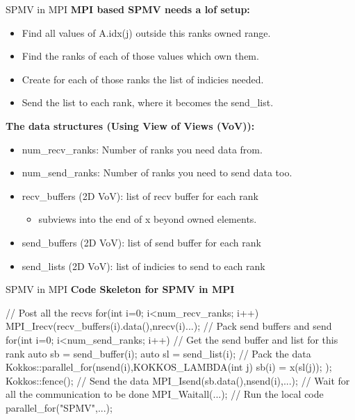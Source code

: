 \begin{frame}[fragile]{SPMV in MPI}
    \textbf{MPI based SPMV needs a lof setup:}
  \begin{itemize}
    \item Find all values of A.idx(j) outside this ranks owned range.
    \item Find the ranks of each of those values which own them.
    \item Create for each of those ranks the list of indicies needed.
    \item Send the list to each rank, where it becomes the send\_list.
  \end{itemize}
  \vspace{5pt}
  \textbf{The data structures (Using View of Views (VoV)):}
  \begin{itemize}
    \item num\_recv\_ranks: Number of ranks you need data from.
    \item num\_send\_ranks: Number of ranks you need to send data too.
    \item recv\_buffers (2D VoV): list of recv buffer for each rank
    \begin{itemize}
      \item subviews into the end of x beyond owned elements.
    \end{itemize}
    \item send\_buffers (2D VoV): list of send buffer for each rank
    \item send\_lists (2D VoV): list of indicies to send to each rank
  \end{itemize}
\end{frame}


\begin{frame}[fragile]{SPMV in MPI}
\textbf{Code Skeleton for SPMV in MPI}
  \begin{code}[keywords={MPI_Irecv,MPI_Isend,MPI_Waitall,parallel_for,fence, Kokkos}]
    // Post all the recvs
    for(int i=0; i<num_recv_ranks; i++) {
      MPI_Irecv(recv_buffers(i).data(),nrecv(i)...);
    }
    // Pack send buffers and send
    for(int i=0; i<num_send_ranks; i++) {
      // Get the send buffer and list for this rank
      auto sb = send_buffer(i);
      auto sl = send_list(i);
      // Pack the data
      Kokkos::parallel_for(nsend(i),KOKKOS_LAMBDA(int j) 
        { sb(i) = x(sl(j)); });
      Kokkos::fence();
      // Send the data
      MPI_Isend(sb.data(),nsend(i),...);
    }
    // Wait for all the communication to be done
    MPI_Waitall(...);
    // Run the local code
    parallel_for("SPMV",...);
  \end{code}
\end{frame}

